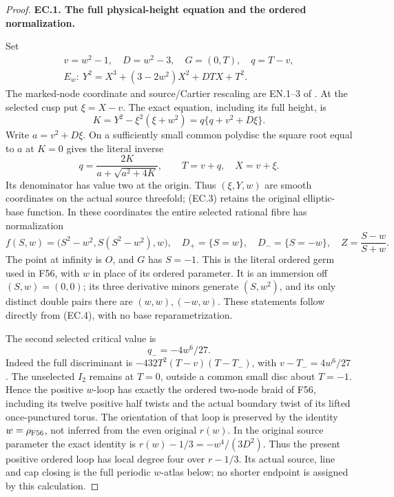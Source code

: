 \begin{proof}
\par\medskip\noindent\textbf{EC.1. The full physical-height equation and the ordered normalization.}\par\nopagebreak[4]

Set
\[
 \begin{gathered}
 v=w^2-1,\quad D=w^2-3,\quad G=(0,T),\quad q=T-v,\\
 E_w:\ Y^2=X^3+(3-2w^2)X^2+DTX+T^2 .
 \end{gathered}
 \tag{EC.1}
\]
The marked-node coordinate and source/Cartier rescaling are EN.1--3 of
. At the selected cusp put
\(\xi=X-v\). The exact equation, including its full height, is
\[
 K=Y^2-\xi^2(\xi+w^2)
       =q\{q+v^2+D\xi\}.
 \tag{EC.2}
\]
Write \(a=v^2+D\xi\). On a sufficiently small common polydisc the
square root equal to \(a\) at \(K=0\) gives the literal inverse
\[
 q=\frac{2K}{a+\sqrt{a^2+4K}},\qquad
 T=v+q,\quad X=v+\xi.
 \tag{EC.3}
\]
Its denominator has value two at the origin. Thus \((\xi,Y,w)\)
are smooth coordinates on the actual source threefold; (EC.3) retains
the original elliptic-base function. In these coordinates the entire
selected rational fibre has normalization
\[
 f(S,w)=\bigl(S^2-w^2,S(S^2-w^2),w\bigr),\quad
 D_+=\{S=w\},\quad D_-=\{S=-w\},\quad
 Z=\frac{S-w}{S+w}.
 \tag{EC.4}
\]
The point at infinity is \(O\), and \(G\) has \(S=-1\). This is
the literal ordered germ used in F56, with \(w\) in place of its
ordered parameter. It is an immersion off \((S,w)=(0,0)\); its three
derivative minors generate \((S,w^2)\), and its only distinct double
pairs there are \((w,w),(-w,w)\). These statements follow directly
from (EC.4), with no base reparametrization.

The second selected critical value is
\[
 q_-=-4w^6/27.
 \tag{EC.5}
\]
Indeed the full discriminant is
\(-432T^2(T-v)(T-T_-)\), with \(v-T_-=4w^6/27\).
The unselected \(I_2\) remains at \(T=0\), outside a common small
disc about \(T=-1\). Hence the positive \(w\)-loop has exactly the
ordered two-node braid of F56, including its twelve positive half
twists and the actual boundary twist of its lifted once-punctured
torus. The orientation of that loop is preserved by the identity
\(w=\rho_{\rm F56}\), not inferred from the even original \(r(w)\).
In the original source parameter the exact identity is
\(r(w)-1/3=-w^4/(3D^2)\). Thus the present positive ordered loop
has local degree four over \(r-1/3\). Its actual source, line and
cap closing is the full periodic \(w\)-atlas below; no shorter
endpoint is assigned by this calculation.


\end{proof}
